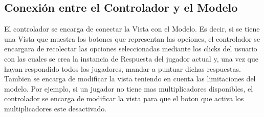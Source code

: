 \documentclass[titlepage,a4paper]{article}
\begin{document}
\subsection{Conexión entre el Controlador y el Modelo}

El controlador se encarga de conectar la Vista con el Modelo. Es decir, si se tiene una Vista que muestra los botones que representan las opciones, el controlador se encargara de recolectar las opciones seleccionadas mediante los clicks del usuario con las cuales se crea la instancia de Respuesta del jugador actual y, una vez que hayan respondido todos los jugadores, mandar a puntuar dichas respuestas. Tambien se encarga de modificar la vista teniendo en cuenta las limitaciones del modelo. Por ejemplo, si un jugador no tiene mas multiplicadores disponibles, el controlador se encarga de modificar la vista para que el boton que activa los multiplicadores este desactivado.
\end{document}
